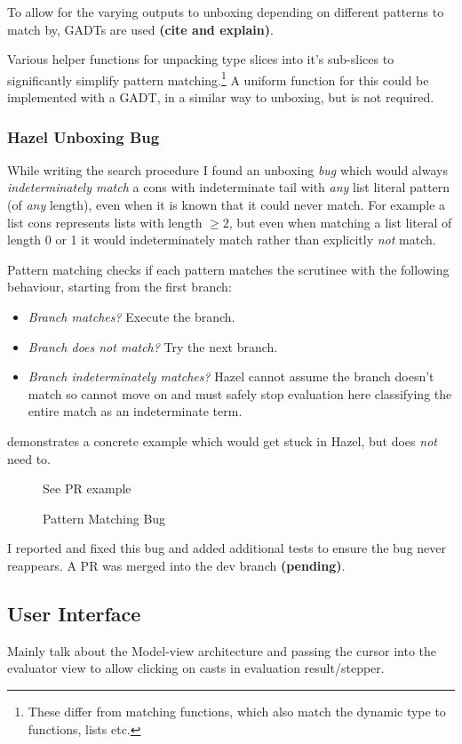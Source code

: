 To allow for the varying outputs to unboxing depending on different patterns to match by, GADTs are used \textbf{(cite and explain)}.

Various helper functions for unpacking type slices into it's sub-slices to significantly simplify pattern matching.\footnote{These differ from matching functions, which also match the dynamic type to functions, lists etc.} A uniform function for this could be implemented with a GADT, in a similar way to unboxing, but is not required.

\subsubsection{Hazel Unboxing Bug}
While writing the search procedure I found an unboxing \textit{bug} which would always \textit{indeterminately match} a cons with indeterminate tail with \textit{any} list literal pattern (of \textit{any} length), even when it is known that it could never match. For example a list cons  represents lists with length $\geq 2$, but even when matching a list literal of length 0 or 1 it would indeterminately match rather than explicitly \textit{not} match. 

Pattern matching checks if each pattern matches the scrutinee with the following behaviour, starting from the first branch:
\begin{itemize}
\item \textit{Branch matches?} Execute the branch.
\item \textit{Branch does not match?} Try the next branch.
\item \textit{Branch indeterminately matches?} Hazel cannot assume the branch doesn't match so cannot move on and must safely stop evaluation here classifying the entire match as an indeterminate term.
\end{itemize}
 demonstrates a concrete example which would get stuck in Hazel, but does \textit{not} need to.

\begin{figure}[h]
See PR example
\caption{Pattern Matching Bug}
\label{fig:PatternMatchingBug}
\end{figure}

I reported and fixed this bug and added additional tests to ensure the bug never reappears. A PR was merged into the dev branch \textbf{(pending)}.
\subsection{User Interface}
Mainly talk about the Model-view architecture and passing the cursor into the evaluator view to allow clicking on casts in evaluation result/stepper.

